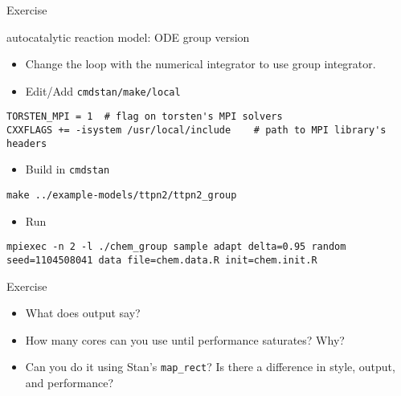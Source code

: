 \documentclass[presentation]{beamer}
\begin{document}
\begin{frame}[fragile,label={sec:org7f849b8}]{Exercise}
 \begin{block}{autocatalytic reaction model: ODE group version}
\begin{itemize}
\item Change the loop with the numerical integrator to use group
integrator.

\item Edit/Add \texttt{cmdstan/make/local}
\end{itemize}
\begin{verbatim}
TORSTEN_MPI = 1  # flag on torsten's MPI solvers
CXXFLAGS += -isystem /usr/local/include    # path to MPI library's headers
\end{verbatim}
\begin{itemize}
\item Build in \texttt{cmdstan}
\end{itemize}
\begin{verbatim}
make ../example-models/ttpn2/ttpn2_group
\end{verbatim}
\begin{itemize}
\item Run
\end{itemize}
\begin{verbatim}
mpiexec -n 2 -l ./chem_group sample adapt delta=0.95 random seed=1104508041 data file=chem.data.R init=chem.init.R
\end{verbatim}
\end{block}
\end{frame}

\begin{frame}[fragile,label={sec:org10c48aa}]{Exercise}
 \begin{itemize}
\item What does output say?
\item How many cores can you use until performance saturates? Why?
\item Can you do it using Stan's \texttt{map\_rect}? Is there a
difference in style, output, and performance?
\end{itemize}
\end{frame}
\end{document}
